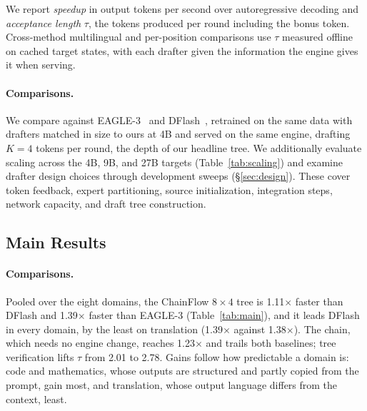 \documentclass{article}
\newcommand{\Sys}{ChainFlow\xspace}
\begin{document}
We report \emph{speedup} in output tokens per second over autoregressive decoding and
\emph{acceptance length} $\tau$, the tokens produced per round including
the bonus token. Cross-method multilingual and per-position comparisons use
$\tau$ measured offline on cached target states, with each drafter given
the information the engine gives it when serving.

\paragraph{Comparisons.}
We compare against EAGLE-3~\citep{li2025eagle3} and
DFlash~\citep{chen2026dflash}, retrained on the same data with drafters
matched in size to ours at 4B and served on the same engine, drafting
$K{=}4$ tokens per round, the depth of our headline tree.
We additionally evaluate scaling across the 4B, 9B, and 27B targets
(Table~\ref{tab:scaling}) and examine drafter design choices through
development sweeps (\S\ref{sec:design}). These cover token feedback, expert
partitioning, source initialization, integration steps, network capacity,
and draft tree construction.

\subsection{Main Results}
\label{sec:main}

\paragraph{Comparisons.}
Pooled over the eight domains, the \Sys{} $8\times4$ tree is 1.11$\times$ faster than DFlash and 1.39$\times$ faster than EAGLE-3 (Table~\ref{tab:main}), and it leads DFlash in every domain, by the least on translation (1.39$\times$ against 1.38$\times$). The chain, which needs no engine change, reaches 1.23$\times$ and trails both baselines; tree verification lifts $\tau$ from 2.01 to 2.78.
Gains follow how predictable a domain is: code and mathematics, whose
outputs are structured and partly copied from the prompt, gain most, and
translation, whose output language differs from the context, least.
\end{document}
